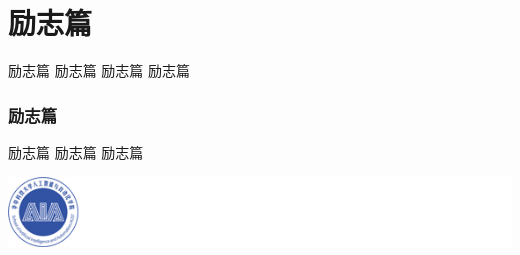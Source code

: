 \section{励志篇}

励志篇 
励志篇 
励志篇 
励志篇 

\subsubsection{励志篇}

励志篇 
励志篇 
励志篇 

\includegraphics{res/rglogo}

